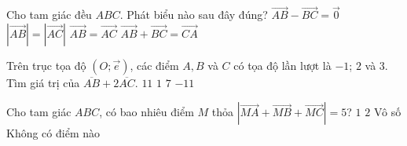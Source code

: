 

\begin{ex}%
	Cho tam giác đều  $ABC$. Phát biểu nào sau đây đúng?
	 \choice
		{$\overrightarrow{AB}-\overrightarrow{BC}=\overrightarrow0$} 
		{\True  $\left|\overrightarrow{AB}\right|=\left|\overrightarrow{AC}\right|$}
		 {$\overrightarrow{AB}=\overrightarrow{AC}$}
		{$\overrightarrow{AB}+\overrightarrow{BC}=\overrightarrow{CA}$} 
\end{ex}

\begin{ex}%
	Trên trục tọa độ $\left(O; \overrightarrow{e}\right)$, các điểm $A, B$  và $C$ có tọa độ lần lượt là $-1$; $2$ và $3$. Tìm giá trị của $\overline{AB}+2\overline{AC}$.
	\choice 
		{\True $11$} 
		{$1$} 
		{$7$} 
		{$-11$} 
	\loigiai{ 
		\[\overline{AB}=2-\left(-1\right)=3, \overline{AC}=3-\left(-1\right)=4\Rightarrow \overline{AB}+2\overline{AC}=3+2\cdot4=11. 
		 \]
	} 
\end{ex}

\begin{ex}%
	Cho tam giác $ABC$, có bao nhiêu điểm $M$ thỏa  $\left|\overrightarrow{MA}+\overrightarrow{MB}+\overrightarrow{MC}\right|=5$?
	 \choice
		 {$1$}
		{$2$} 
		{\True  Vô số}
		{Không có  điểm nào}
\end{ex}

